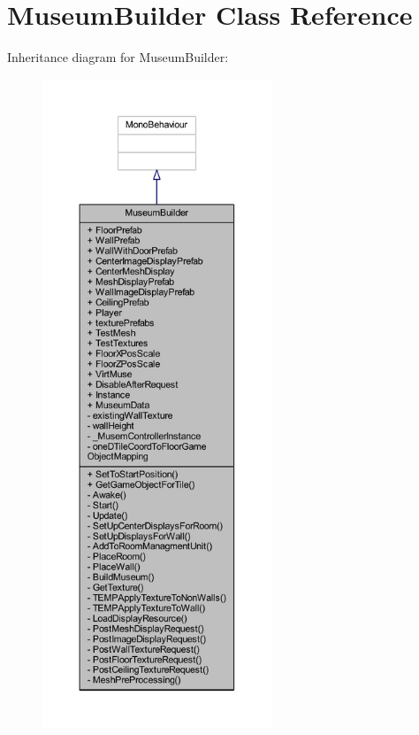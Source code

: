 \hypertarget{class_museum_builder}{}\section{Museum\+Builder Class Reference}
\label{class_museum_builder}


Inheritance diagram for Museum\+Builder\+:
\nopagebreak
\begin{figure}[H]
\begin{center}
\leavevmode
\includegraphics[height=550pt]{class_museum_builder__inherit__graph}
\end{center}
\end{figure}


